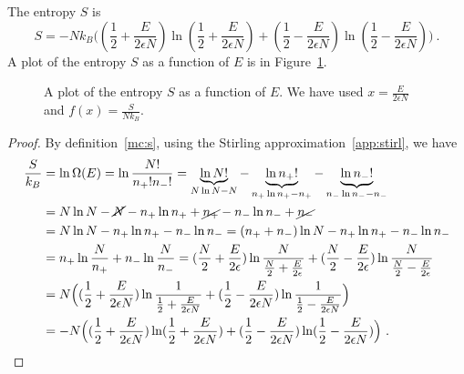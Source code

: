     The entropy $S$ is 
    \begin{equation*}
        S = - N k_B \Big ( (\frac{1}{2} + \frac{E}{2\epsilon N}) \ln (\frac{1}{2} + \frac{E}{2\epsilon N} ) + (\frac{1}{2} - \frac{E}{2\epsilon N}) \ln (\frac{1}{2} - \frac{E}{2\epsilon N} ) \Big ) ~.
    \end{equation*}
    A plot of the entropy $S$ as a function of $E$ is in Figure~\ref{en:s}.
    \begin{figure}
        \centering
        \caption{A plot of the entropy $S$ as a function of $E$. We have used $x = \frac{E}{2 \epsilon N} $ and $f(x) = \frac{S}{N k_B}$.}
        \label{en:s}
    \end{figure}
    \begin{proof}
        By definition~\eqref{mc:s}, using the Stirling approximation~\eqref{app:stirl}, we have
        \begin{equation*}
        \begin{aligned}
            \frac{S}{k_B} & = \ln \Omega (E) = \ln \frac{N!}{n_+! n_-!} = \underbrace{\ln N!}_{N \ln N - N} - \underbrace{\ln n_+!}_{n_+ \ln n_+ - n_+} - \underbrace{\ln n_-!}_{n_- \ln n_- - n_-} \\ & = N \ln N - \cancel{N} - n_+ \ln n_+ + \cancel{n_+} - n_- \ln n_- + \cancel{n_-} \\ & = N \ln N - n_+ \ln n_+ - n_- \ln n_- = (n_+ + n_-) \ln N - n_+ \ln n_+ - n_- \ln n_- \\ & = n_+ \ln \frac{N}{n_+} + n_- \ln \frac{N}{n_-} = (\frac{N}{2} + \frac{E}{2\epsilon}) \ln \frac{N}{\frac{N}{2} + \frac{E}{2\epsilon}} + (\frac{N}{2} - \frac{E}{2\epsilon}) \ln \frac{N}{\frac{N}{2} - \frac{E}{2\epsilon}} \\ & = N \Big ( (\frac{1}{2} + \frac{E}{2\epsilon N}) \ln \frac{1}{\frac{1}{2} + \frac{E}{2\epsilon N}} + (\frac{1}{2} - \frac{E}{2\epsilon N}) \ln \frac{1}{\frac{1}{2} - \frac{E}{2\epsilon N}} \Big ) \\ & = - N \Big ( (\frac{1}{2} + \frac{E}{2\epsilon N}) \ln (\frac{1}{2} + \frac{E}{2\epsilon N} ) + (\frac{1}{2} - \frac{E}{2\epsilon N}) \ln (\frac{1}{2} - \frac{E}{2\epsilon N} )\Big ) ~.
        \end{aligned}
        \end{equation*}
    \end{proof}
    
